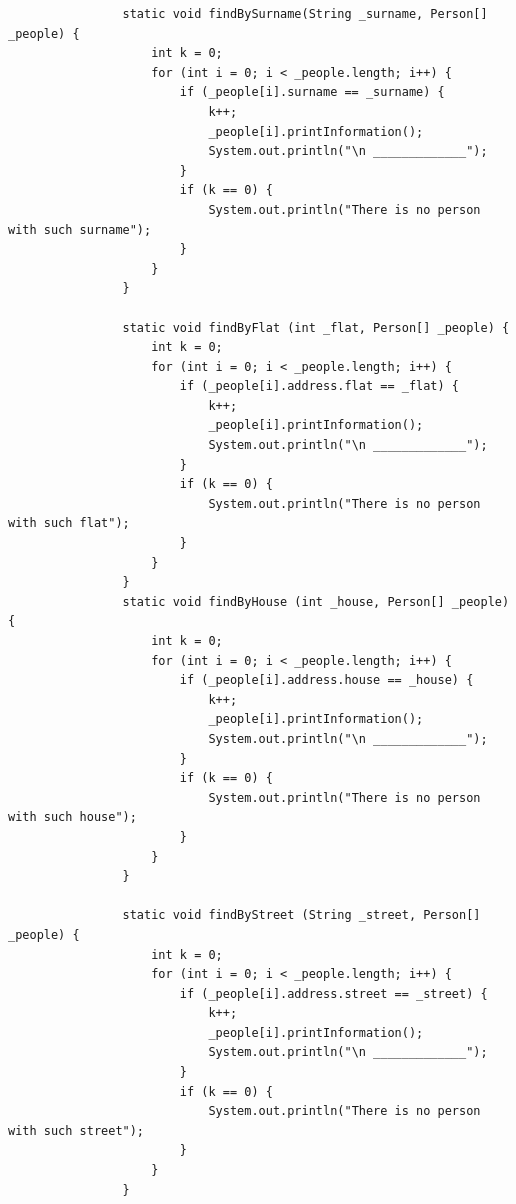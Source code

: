 \documentclass[a4paper]{article}
\begin{document}
\begin{enumerate}
\begin{lstlisting}
                static void findBySurname(String _surname, Person[] _people) {
                    int k = 0;
                    for (int i = 0; i < _people.length; i++) {
                        if (_people[i].surname == _surname) {
                            k++;
                            _people[i].printInformation();
                            System.out.println("\n _____________");
                        } 
                        if (k == 0) {
                            System.out.println("There is no person with such surname");
                        }
                    }
                }
            
                static void findByFlat (int _flat, Person[] _people) {
                    int k = 0;
                    for (int i = 0; i < _people.length; i++) {
                        if (_people[i].address.flat == _flat) {
                            k++;
                            _people[i].printInformation();
                            System.out.println("\n _____________");
                        } 
                        if (k == 0) {
                            System.out.println("There is no person with such flat");
                        }
                    }
                }
                static void findByHouse (int _house, Person[] _people) {
                    int k = 0;
                    for (int i = 0; i < _people.length; i++) {
                        if (_people[i].address.house == _house) {
                            k++;
                            _people[i].printInformation();
                            System.out.println("\n _____________");
                        } 
                        if (k == 0) {
                            System.out.println("There is no person with such house");
                        }
                    }
                }
                
                static void findByStreet (String _street, Person[] _people) {
                    int k = 0;
                    for (int i = 0; i < _people.length; i++) {
                        if (_people[i].address.street == _street) {
                            k++;
                            _people[i].printInformation();
                            System.out.println("\n _____________");
                        } 
                        if (k == 0) {
                            System.out.println("There is no person with such street");
                        }
                    }
                }
            

\end{lstlisting}
\end{enumerate}
\end{document}
